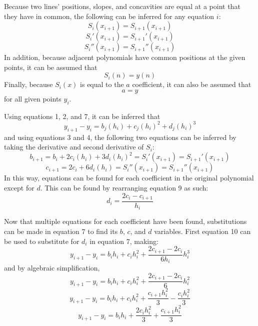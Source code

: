 \documentclass[12pt, letterpaper]{article} %
\begin{document}
Because two lines' positions, slopes, and concavities are equal at a point that they have in common, the following can be inferred for any equation \(i\):
\begin{equation}
S_i(x_{i+1}) = S_{i+1}(x_{i+1})
\end{equation}
\begin{equation}
S_i'(x_{i+1}) = S_{i+1}'(x_{i+1})
\end{equation}
\begin{equation}
S_i''(x_{i+1}) = S_{i+1}''(x_{i+1})
\end{equation}
In addition, because adjacent polynomials have common positions at the given points, it can be assumed that
\begin{equation}
S_i(n) = y(n)
\end{equation}
Finally, because \(S_i(x)\) is equal to the \(a\) coefficient, it can also be assumed that
\begin{equation}
a = y
\end{equation}
for all given points \(y_i\).

Using equations 1, 2, and 7, it can be inferred that
\begin{equation}
y_{i + 1} - y_i =  b_j(h_i) + c_j(h_i)^2 + d_j(h_i)^3
\end{equation}
and using equations 3 and 4, the following two equations can be inferred by taking the derivative and second derivative of \(S_i\):
\begin{equation}
b_{i + 1} = b_i + 2c_i(h_i) + 3d_i(h_i)^2 = S_i'(x_{i + 1}) = S_{i + 1}'(x_{i + 1})
\end{equation}
\begin{equation}
c_{i + 1} = 2c_i + 6d_i(h_i) = S_i''(x_{i + 1}) = S_{i + 1}''(x_{i + 1})
\end{equation}
In this way, equations can be found for each coefficient in the original polynomial except for \(d\). This can be found by rearranging equation 9 as such:
\begin{equation}
d_i = \dfrac{2c_i - c_{i + 1}}{h_i}
\end{equation}

Now that multiple equations for each coefficient have been found, substitutions can be made in equation 7 to find its \(b\), \(c\), and \(d\) variables. First equation 10 can be used to substitute for \(d_i\) in equation 7, making:
\begin{equation}
y_{i + 1} - y_i = b_ih_i + c_ih_i^2 + \dfrac{2c_{i + 1} - 2c_i}{6h_i}h_i^3
\end{equation}
and by algebraic simplification,
\begin{equation}
y_{i + 1} - y_i = b_ih_i + c_ih_i^2 + \dfrac{2c_{i + 1} - 2c_i}{6}h_i^2
\end{equation}
\begin{equation}
y_{i + 1} - y_i = b_ih_i + c_ih_i^2 + \dfrac{c_{i + 1}h_i^2}{3} - \dfrac{c_ih_i^2}{3}
\end{equation}
\begin{equation}
y_{i + 1} - y_i = b_ih_i + \dfrac{2c_ih_i^2}{3} + \dfrac{c_{i + 1}h_i^2}{3}
\end{equation}
\end{document}

